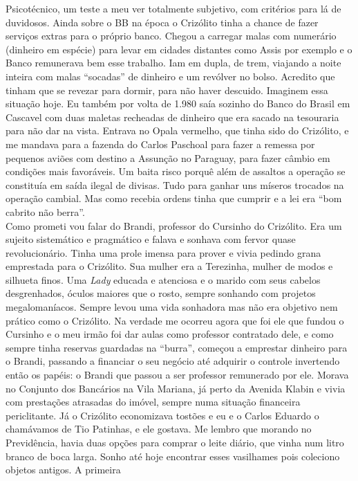 \documentclass[12pt,brazil,]{book}
\begin{document}
Psicotécnico, um teste a meu ver totalmente subjetivo, com critérios
para lá de duvidosos. Ainda sobre o BB na época o Crizólito tinha a
chance de fazer serviços extras para o próprio banco. Chegou a carregar
malas com numerário (dinheiro em espécie) para levar em cidades
distantes como Assis por exemplo e o Banco remunerava bem esse trabalho.
Iam em dupla, de trem, viajando a noite inteira com malas ``socadas'' de
dinheiro e um revólver no bolso. Acredito que tinham que se revezar para
dormir, para não haver descuido. Imaginem essa situação hoje. Eu também
por volta de 1.980 saía sozinho do Banco do Brasil em Cascavel com duas
maletas recheadas de dinheiro que era sacado na tesouraria para não dar
na vista. Entrava no Opala vermelho, que tinha sido do Crizólito, e me
mandava para a fazenda do Carlos Paschoal para fazer a remessa por
pequenos aviões com destino a Assunção no Paraguay, para fazer câmbio em
condições mais favoráveis. Um baita risco porquê além de assaltos a
operação se constituía em saída ilegal de divisas. Tudo para ganhar uns
míseros trocados na operação cambial. Mas como recebia ordens tinha que
cumprir e a lei era ``bom cabrito não berra''.\\
Como prometi vou falar do Brandi, professor do Cursinho do Crizólito.
Era um sujeito sistemático e pragmático e falava e sonhava com fervor
quase revolucionário. Tinha uma prole imensa para prover e vivia pedindo
grana emprestada para o Crizólito. Sua mulher era a Terezinha, mulher de
modos e silhueta finos. Uma \emph{Lady} educada e atenciosa e o marido
com seus cabelos desgrenhados, óculos maiores que o rosto, sempre
sonhando com projetos megalomaníacos. Sempre levou uma vida sonhadora
mas não era objetivo nem prático como o Crizólito. Na verdade me ocorreu
agora que foi ele que fundou o Cursinho e o meu irmão foi dar aulas como
professor contratado dele, e como sempre tinha reservas guardadas na
``burra'', começou a emprestar dinheiro para o Brandi, passando a
financiar o seu negócio até adquirir o controle invertendo então os
papéis: o Brandi que passou a ser professor remunerado por ele. Morava
no Conjunto dos Bancários na Vila Mariana, já perto da Avenida Klabin e
vivia com prestações atrasadas do imóvel, sempre numa situação
financeira periclitante. Já o Crizólito economizava tostões e eu e o
Carlos Eduardo o chamávamos de Tio Patinhas, e ele gostava. Me lembro
que morando no Previdência, havia duas opções para comprar o leite
diário, que vinha num litro branco de boca larga. Sonho até hoje
encontrar esses vasilhames pois coleciono objetos antigos. A primeira
\end{document}
